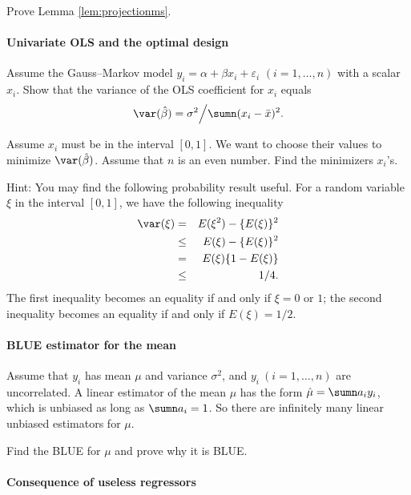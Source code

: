 Prove Lemma \ref{lem:projectionms}. 



\paragraph{Univariate OLS and the optimal design}
\label{hw::gaussmarkov-1d}

Assume the Gauss--Markov model $y_i = \alpha + \beta x_i + \varepsilon_i$ $(i=1,\ldots, n)$ with a scalar $x_i$. Show that the variance of the OLS coefficient for $x_i$ equals
$$
\var(  \hat{\beta} ) = \sigma^2 \Big / \sumn (x_i - \bar{x})^2 .
$$

Assume $x_i$ must be in the interval $[0, 1]$. We want to choose their values to minimize $\var(  \hat{\beta} )$. Assume that $n$ is an even number. Find the minimizers $x_i$'s. 

Hint: You may find the following probability result useful. For a random variable $\xi$ in the interval $[0, 1]$, we have the following inequality
\begin{eqnarray*}
\var(\xi) &=& E(\xi^2) - \{ E(\xi) \}^2 \\
 &\leq & E(\xi) - \{ E(\xi) \}^2  \\
 &=& E(\xi)\{ 1 - E(\xi) \} \\
 &\leq & 1/4. 
\end{eqnarray*}
The first inequality becomes an equality if and only if $\xi=0$ or $1$; the second inequality becomes an equality if and only if $E(\xi) = 1/2.$



\paragraph{BLUE estimator for the mean}\label{hw04::blue-mean}

Assume that $y_i$ has mean $\mu$ and variance $\sigma^2$, and $y_i\ (i=1,\ldots, n)$ are uncorrelated. A linear estimator of the mean $\mu$ has the form $\hat{\mu} = \sumn a_i y_i$, which is unbiased as long as $ \sumn a_i = 1$. So there are infinitely many linear unbiased estimators for $\mu$. 

Find the BLUE for $\mu$ and prove why it is BLUE. 




\paragraph{Consequence of useless regressors}\label{hw4::useless-regressor}

